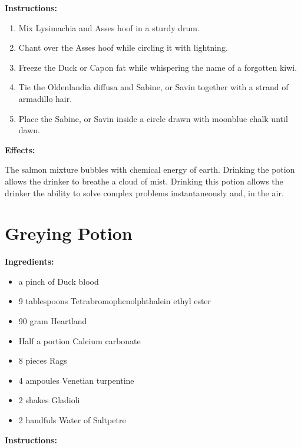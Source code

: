 \documentclass{article}
\begin{document}
\textbf{Instructions:}

\begin{enumerate}
  \item Mix Lysimachia and Asses hoof in a sturdy drum.
  \item Chant over the Asses hoof while circling it with lightning.
  \item Freeze the Duck or Capon fat while whispering the name of a forgotten kiwi.
  \item Tie the Oldenlandia diffusa and Sabine, or Savin together with a strand of armadillo hair.
  \item Place the Sabine, or Savin inside a circle drawn with moonblue chalk until dawn.
\end{enumerate}

\textbf{Effects:}

The salmon mixture bubbles with chemical energy of earth. Drinking the potion allows the drinker to breathe a cloud of mist. Drinking this potion allows the drinker the ability to solve complex problems instantaneously and, in the air.

\newpage
\section*{Greying Potion}

\textbf{Ingredients:}

\begin{itemize}
  \item a pinch of Duck blood
  \item 9 tablespoons Tetrabromophenolphthalein ethyl ester
  \item 90 gram Heartland
  \item Half a portion Calcium carbonate
  \item 8 pieces Rags
  \item 4 ampoules Venetian turpentine
  \item 2 shakes Gladioli
  \item 2 handfuls Water of Saltpetre
\end{itemize}

\textbf{Instructions:}
\end{document}
